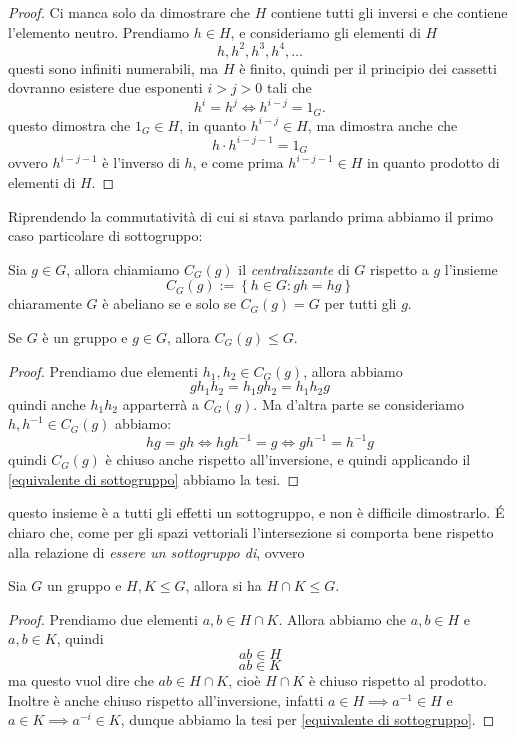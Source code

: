 \documentclass[11pt]{scrartcl}
\begin{document}
	\begin{proof}
		Ci manca solo da dimostrare che $H$ contiene tutti gli inversi e che contiene l'elemento neutro. Prendiamo $h\in H$, e consideriamo gli elementi di $H$
		$$h,h^2,h^3,h^4,\dots$$
		questi sono infiniti numerabili, ma $H$ è finito, quindi per il principio dei cassetti dovranno esistere due esponenti $i>j>0$ tali che
		$$h^i=h^j \iff h^{i-j}=1_G.$$
		questo dimostra che $1_G\in H$, in quanto $h^{i-j}\in H$, ma dimostra anche che 
		$$h\cdot h^{i-j-1}=1_G$$
		ovvero $h^{i-j-1}$ è l'inverso di $h$, e come prima $h^{i-j-1}\in H$ in quanto prodotto di elementi di $H$.
	\end{proof}
	Riprendendo la commutatività di cui si stava parlando prima abbiamo il primo caso particolare di sottogruppo:
	\begin{definition}[Centralizzante]
		Sia $g\in G$, allora chiamiamo $C_G(g)$ il \textit{centralizzante} di $G$ rispetto a $g$ l'insieme
		$$C_G(g):=\left\{h\in G: gh=hg\right\}$$
		chiaramente $G$ è abeliano se e solo se $C_G(g)=G$ per tutti gli $g$.
	\end{definition}
	\begin{proposition}
		Se $G$ è un gruppo e $g\in G$, allora $C_G(g)\le G$.
	\end{proposition}
	\begin{proof}
		Prendiamo due elementi $h_1,h_2\in C_G(g)$, allora abbiamo
		$$gh_1h_2=h_1gh_2=h_1h_2g$$
		quindi anche $h_1h_2$ apparterrà a $C_G(g)$. Ma d'altra parte se consideriamo $h,h^{-1}\in C_G(g)$ abbiamo:
		$$hg=gh \iff hgh^{-1}=g \iff gh^{-1}=h^{-1}g$$
		quindi $C_G(g)$ è chiuso anche rispetto all'inversione, e quindi applicando il \ref{equivalente di sottogruppo} abbiamo la tesi.
	\end{proof}
	questo insieme è a tutti gli effetti un sottogruppo, e non è difficile dimostrarlo. \'E chiaro che, come per gli spazi vettoriali l'intersezione si comporta bene rispetto alla relazione di \textit{essere un sottogruppo di}, ovvero
	\begin{lemma}
		Sia $G$ un gruppo e $H,K\le G$, allora si ha $H\cap K \le G$.
	\end{lemma}
	\begin{proof}
		Prendiamo due elementi $a,b\in H\cap K$. Allora abbiamo che $a,b\in H$ e $a,b\in K$, quindi 
		$$ab\in H$$
		$$ab\in K$$
		ma questo vuol dire che $ab\in H\cap K$, cioè $H\cap K$ è chiuso rispetto al prodotto. Inoltre è anche chiuso rispetto all'inversione, infatti $a\in H \implies a^{-1}\in H$ e $a\in K \implies a^{-i} \in K$, dunque abbiamo la tesi per \ref{equivalente di sottogruppo}.
	\end{proof}
\end{document}
